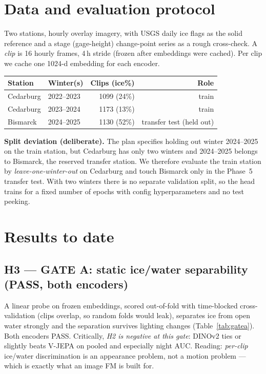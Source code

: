 \documentclass[11pt]{article}
\begin{document}
\section{Data and evaluation protocol}
Two stations, hourly overlay imagery, with USGS daily ice flags as the solid reference and a
stage (gage-height) change-point series as a rough cross-check. A \emph{clip} is 16 hourly frames,
4\,h stride (frozen after embeddings were cached). Per clip we cache one 1024-d embedding for each
encoder.

\begin{center}\small
\begin{tabular}{llrr}
\toprule
Station & Winter(s) & Clips (ice\%) & Role \\
\midrule
Cedarburg & 2022--2023 & 1099 (24\%) & train \\
Cedarburg & 2023--2024 & 1173 (13\%) & train \\
Bismarck  & 2024--2025 & 1130 (52\%) & transfer test (held out) \\
\bottomrule
\end{tabular}
\end{center}

\textbf{Split deviation (deliberate).} The plan specifies holding out winter 2024--2025 on the
train station, but Cedarburg has only two winters and 2024--2025 belongs to Bismarck, the
reserved transfer station. We therefore evaluate the train station by \emph{leave-one-winter-out}
on Cedarburg and touch Bismarck only in the Phase~5 transfer test. With two winters there is no
separate validation split, so the head trains for a fixed number of epochs with config
hyperparameters and no test peeking.

\section{Results to date}

\subsection{H3 --- GATE A: static ice/water separability (PASS, both encoders)}
A linear probe on frozen embeddings, scored out-of-fold with time-blocked cross-validation
(clips overlap, so random folds would leak), separates ice from open water strongly and the
separation survives lighting changes (Table~\ref{tab:gatea}). Both encoders PASS. Critically,
\emph{H2 is negative at this gate}: DINOv2 ties or slightly beats V-JEPA on pooled and especially
night AUC. Reading: \emph{per-clip} ice/water discrimination is an appearance problem, not a
motion problem --- which is exactly what an image FM is built for.
\end{document}
